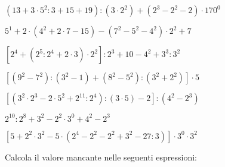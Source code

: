 \begin{esercizio} %
\((13+3\cdot5^2:3+15+19):(3\cdot2^2)+(2^3-2^2-2)\cdot170^0\) 
\end{esercizio}
\begin{esercizio} %
\(5^1+2\cdot(4^2+2\cdot7-15)-(7^2-5^2-4^2)\cdot2^2+7\) 
\end{esercizio}
\begin{esercizio} %
\([2^4+(2^5:2^4+2\cdot3)\cdot2^2]:2^3+10-4^2+3^3:3^2\) 
\end{esercizio}
\begin{esercizio} %
\([(9^2-7^2):(3^2-1)+(8^2-5^2):(3^2+2^2)]\cdot5\) 
\end{esercizio}
\begin{esercizio} %
\([(3^2\cdot2^3-2\cdot5^2+2^{11}:2^4):(3\cdot5)-2]:(4^2-2^3)\) 
\end{esercizio}
\begin{esercizio} %
\(2^{10}:2^8+3^2-2^2\cdot3^0+4^2-2^3\) 
\end{esercizio}
\begin{esercizio} %
\([5+2^2\cdot3^2-5\cdot(2^4-2^2-2^2+3^2-27:3)]\cdot3^0\cdot3^2\) 
\end{esercizio}
% 
% 

Calcola il valore mancante nelle seguenti espressioni:

